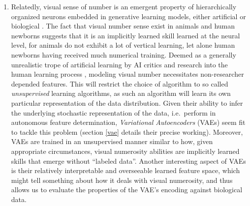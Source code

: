 \documentclass[twocolumn]{article}
\providecommand{\tightlist}{%
  \setlength{\itemsep}{0pt}\setlength{\parskip}{0pt}}
\begin{document}
\begin{enumerate}
\def\labelenumi{\arabic{enumi}.}
\setcounter{enumi}{2}
\tightlist
\item
  Relatedly, visual sense of number is an emergent property of
  hierarchically organized neurons embedded in generative learning
  models, either artificial or biological
  \citetext{\citealp{stoianov2012}; \citealp[the brain can be
  characterized as building a predictive modeler, or a ``Bayesian
  machine'',][]{bayesianbrain}; \citealp{bayes2}}. The fact that visual
  number sense exist in animals and human newborns suggests that it is
  an implicitly learned skill learned at the neural level, for animals
  do not exhibit a lot of vertical learning, let alone human newborns
  having received much numerical training. Deemed as a generally
  unrealistic trope of artificial learning by AI critics
  \citep{dreyfus2007heideggerian} and research into the human learning
  process \citep{Zorzi2013}, modeling visual number necessitates
  non-researcher depended features. This will restrict the choice of
  algorithm to so called \emph{unsupervised} learning algorithms, as
  such an algorithm will learn its own particular representation of the
  data distribution. Given their ability to infer the underlying
  stochastic representation of the data, i.e.~perform in autonomous
  feature determination, \emph{Variational Autoencoders} (VAEs) seem fit
  to tackle this problem (section \ref{vae}
  details their precise working). Moreover, VAEs are trained in an
  unsupervised manner similar to how, given appropriate circumstances,
  visual numerosity abilities are implicitly learned skills that emerge
  without ``labeled data''. Another interesting aspect of VAEs is their
  relatively interpretable and overseeable learned feature space, which
  might tell something about how it deals with visual numerosity, and
  thus allows us to evaluate the properties of the VAE's encoding
  against biological data.
\end{enumerate}
\end{document}
